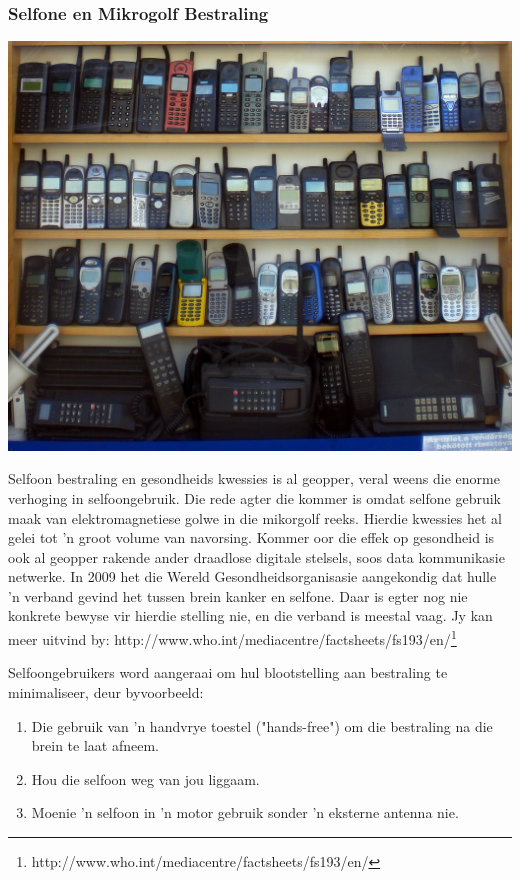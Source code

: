             \subsubsection*{Selfone en Mikrogolf Bestraling}
            \nopagebreak
\begin{minipage}{.5\textwidth}
\includegraphics[width=.8\columnwidth]{photos/cellphones_kapungo.jpg}
\end{minipage}
\begin{minipage}{.5\textwidth}
            \label{m38779*id189654} Selfoon bestraling en gesondheids kwessies is al geopper, veral weens die enorme verhoging in selfoongebruik. Die rede agter die kommer is omdat selfone gebruik maak van elektromagnetiese golwe in die mikorgolf reeks. Hierdie kwessies het al gelei tot 'n groot volume van navorsing. Kommer oor die effek op gesondheid is ook al geopper rakende ander draadlose digitale stelsels, soos data kommunikasie netwerke. 
In 2009 het die Wereld Gesondheidsorganisasie aangekondig dat hulle 'n verband gevind het tussen brein kanker en selfone. Daar is egter nog nie konkrete bewyse vir hierdie stelling nie, en die verband is meestal vaag. Jy kan meer uitvind by: http://www.who.int/mediacentre/factsheets/fs193/en/\footnote{http://www.who.int/mediacentre/factsheets/fs193/en/}
        \par 
\end{minipage}
        \label{m38779*id189664} Selfoongebruikers word aangeraai om hul blootstelling aan bestraling te minimaliseer, deur byvoorbeeld:\par 
        \label{m38779*id189668}\begin{enumerate}[noitemsep, label=\textbf{\arabic*}. ] 
            \label{m38779*uid24}\item Die gebruik van 'n handvrye toestel ("hands-free") om die bestraling na die brein te laat afneem.
\label{m38779*uid25}\item Hou die selfoon weg van jou liggaam.
\label{m38779*uid26}\item Moenie 'n selfoon in 'n motor gebruik sonder 'n eksterne antenna nie. 
\end{enumerate}
